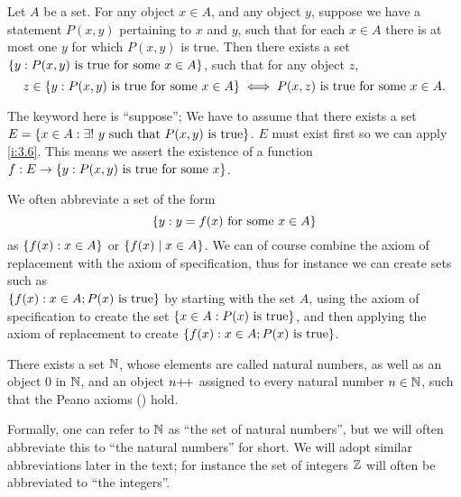 \begin{ax}[Replacement]\label{i:3.6}
  Let \(A\) be a set.
  For any object \(x \in A\), and any object \(y\), suppose we have a statement \(P(x, y)\) pertaining to \(x\) and \(y\), such that for each \(x \in A\) there is at most one \(y\) for which \(P(x, y)\) is true.
  Then there exists a set \(\left\lbrace y : P(x, y) \text{ is true for some } x \in A\right\rbrace\), such that for any object \(z\),
  \[
    z \in \left\lbrace y: P(x, y) \text{ is true for some } x \in A\right\rbrace \iff P(x, z) \text{ is true for some } x \in A.
  \]
\end{ax}

\begin{note}
  The keyword here is ``suppose'';
  We have to assume that there exists a set \(E = \left\lbrace x \in A : \exists!\ y \text{ such that } P(x, y) \text{ is true}\right\rbrace\).
  \(E\) must exist first so we can apply \cref{i:3.6}.
  This means we assert the existence of a function \(f : E \to \left\lbrace y : P(x, y) \text{ is true for some } x\right\rbrace\).
\end{note}

\begin{note}
  We often abbreviate a set of the form
  \[
    \left\lbrace y : y = f(x) \text{ for some } x \in A\right\rbrace
  \]
  as \(\left\lbrace f(x) : x \in A\right\rbrace\) or \(\left\lbrace f(x) \mid x \in A\right\rbrace\).
  We can of course combine the axiom of replacement with the axiom of specification, thus for instance we can create sets such as \\
  \(\left\lbrace f(x) : x \in A; P(x) \text{ is true}\right\rbrace\) by starting with the set \(A\), using the axiom of specification to create the set \(\left\lbrace x \in A : P(x) \text{ is true}\right\rbrace\), and then applying the axiom of replacement to create \(\left\lbrace f(x) : x \in A; P(x) \text{ is true}\right\rbrace\).
\end{note}

\begin{ax}[Infinity]\label{i:3.7}
  There exists a set \(\mathbb{N}\), whose elements are called natural numbers, as well as an object \(0\) in \(\mathbb{N}\), and an object \(n{+}\!{+}\) assigned to every natural number \(n \in \mathbb{N}\), such that the Peano axioms () hold.
\end{ax}

\begin{note}
  Formally, one can refer to \(\mathbb{N}\) as ``the set of natural numbers'', but we will often abbreviate this to ``the natural numbers'' for short.
  We will adopt similar abbreviations later in the text;
  for instance the set of integers \(\mathbb{Z}\) will often be abbreviated to ``the integers''.
\end{note}

